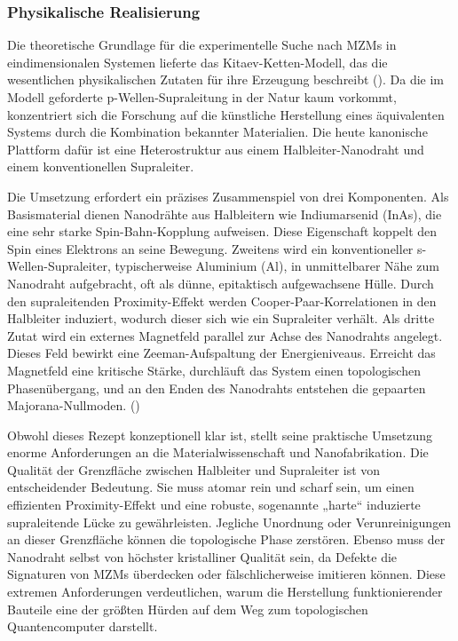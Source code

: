 \subsubsection{Physikalische Realisierung}
Die theoretische Grundlage für die experimentelle Suche nach MZMs in eindimensionalen Systemen lieferte das Kitaev-Ketten-Modell, das die wesentlichen physikalischen Zutaten für ihre Erzeugung beschreibt (\cite{PDFMicrosoftsMajorana2025}). Da die im Modell geforderte p-Wellen-Supraleitung in der Natur kaum vorkommt, konzentriert sich die Forschung auf die künstliche Herstellung eines äquivalenten Systems durch die Kombination bekannter Materialien. Die heute kanonische Plattform dafür ist eine Heterostruktur aus einem Halbleiter-Nanodraht und einem konventionellen Supraleiter.

Die Umsetzung erfordert ein präzises Zusammenspiel von drei Komponenten. Als Basismaterial dienen Nanodrähte aus Halbleitern wie Indiumarsenid (InAs), die eine sehr starke Spin-Bahn-Kopplung aufweisen. Diese Eigenschaft koppelt den Spin eines Elektrons an seine Bewegung. Zweitens wird ein konventioneller s-Wellen-Supraleiter, typischerweise Aluminium (Al), in unmittelbarer Nähe zum Nanodraht aufgebracht, oft als dünne, epitaktisch aufgewachsene Hülle. Durch den supraleitenden Proximity-Effekt werden Cooper-Paar-Korrelationen in den Halbleiter induziert, wodurch dieser sich wie ein Supraleiter verhält. Als dritte Zutat wird ein externes Magnetfeld parallel zur Achse des Nanodrahts angelegt. Dieses Feld bewirkt eine Zeeman-Aufspaltung der Energieniveaus. Erreicht das Magnetfeld eine kritische Stärke, durchläuft das System einen topologischen Phasenübergang, und an den Enden des Nanodrahts entstehen die gepaarten Majorana-Nullmoden. (\cite{amorimMajoranaBraidingDynamics2015})

Obwohl dieses Rezept konzeptionell klar ist, stellt seine praktische Umsetzung enorme Anforderungen an die Materialwissenschaft und Nanofabrikation. Die Qualität der Grenzfläche zwischen Halbleiter und Supraleiter ist von entscheidender Bedeutung. Sie muss atomar rein und scharf sein, um einen effizienten Proximity-Effekt und eine robuste, sogenannte „harte“ induzierte supraleitende Lücke zu gewährleisten. Jegliche Unordnung oder Verunreinigungen an dieser Grenzfläche können die topologische Phase zerstören. Ebenso muss der Nanodraht selbst von höchster kristalliner Qualität sein, da Defekte die Signaturen von MZMs überdecken oder fälschlicherweise imitieren können. Diese extremen Anforderungen verdeutlichen, warum die Herstellung funktionierender Bauteile eine der größten Hürden auf dem Weg zum topologischen Quantencomputer darstellt.


